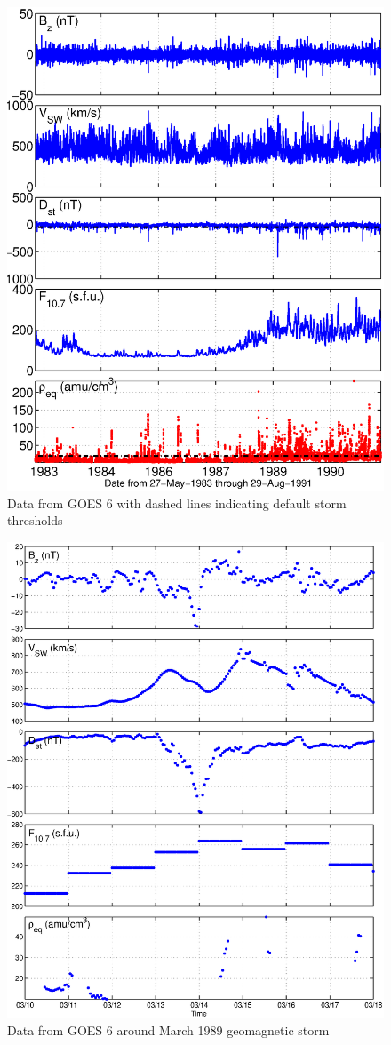 \begin{figure}[htp!]
	\centering
	\includegraphics[width=0.7\linewidth]{Figures/alldata-GOES6-1983-1991}
	\caption{Data from GOES 6 with dashed lines indicating default storm thresholds}
	\label{fig:alldata-GOES6-1983-1991}
\end{figure}
\begin{figure}[htp!]
	\centering
	\includegraphics[width=0.7\linewidth]{Figures/alldata-GOES6-1989-1989}
	\caption{Data from GOES 6 around March 1989 geomagnetic storm}
	\label{fig:alldata-GOES6-1989-1989}
\end{figure}



